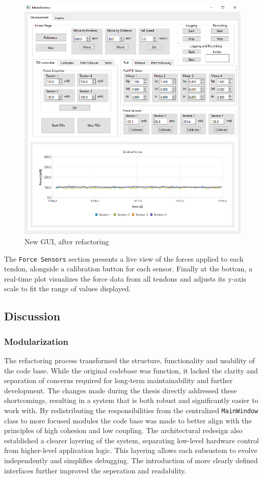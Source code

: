 \begin{figure} [H]
    \centering
    \includegraphics[width=0.85\linewidth]{images/gui/main.PNG}
    \caption{New GUI, after refactoring}
    \label{fig:gui}
\end{figure}
The \texttt{Force Sensors} section presents a live view of the forces applied to each tendon, alongside a calibration button for each sensor. Finally at the bottom, a real-time plot visualizes the force data from all tendons and adjusts its y-axis scale to fit the range of values displayed.


\subsection{Discussion}
\subsubsection{Modularization}
The refactoring process transformed the structure, functionality and usability of the code base. While the original codebase was function, it lacked the clarity and separation of concerns required for long-term maintainability and further development. The changes made during the thesis directly addressed these shortcomings, resulting in a system that is both robust and significantly easier to work with.
\newline \newline
By redistributing the responsibilities from the centralized \texttt{MainWindow} class to more focused modules the code base was made to better align with the principles of high cohesion and low coupling. The architectural redesign also established a clearer layering of the system, separating low-level hardware control from higher-level application logic. This layering allows each subsustem to evolve independently and simplifies debugging. The introduction of more clearly defined interfaces further improved the seperation and readability.

